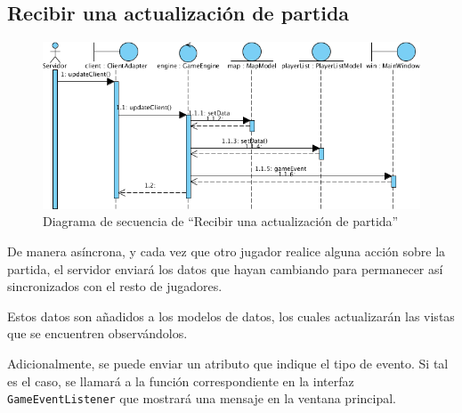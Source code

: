 \subsection{Recibir una actualización de partida}

\begin{figure}[ht]
\centering
\includegraphics[scale=0.6]{img/ch03devel-update.png}
\caption{Diagrama de secuencia de ``Recibir una actualización de partida''}
\end{figure}

De manera asíncrona, y cada vez que otro jugador realice alguna acción sobre la
partida, el servidor enviará los datos que hayan cambiando para permanecer así
sincronizados con el resto de jugadores.

Estos datos son añadidos a los modelos de datos, los cuales actualizarán las
vistas que se encuentren observándolos.

Adicionalmente, se puede enviar un atributo que indique el tipo de evento. Si
tal es el caso, se llamará a la función correspondiente en la interfaz
\texttt{GameEventListener} que mostrará una mensaje en la ventana principal.
